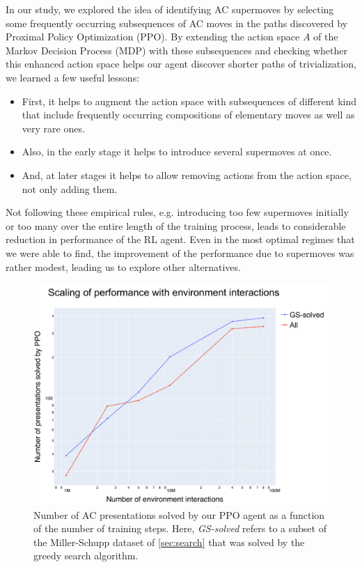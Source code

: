 In our study, we explored the idea of identifying AC supermoves by selecting some frequently occurring subsequences of AC moves in the paths discovered by Proximal Policy Optimization (PPO). By extending the action space $A$ of the Markov Decision Process (MDP) with these subsequences and checking whether this enhanced action space helps our agent discover shorter paths of trivialization, we learned a few useful lessons:

\begin{itemize}

\item First, it helps to augment the action space with subsequences of different kind that include frequently occurring compositions of elementary moves as well as very rare ones.

\item  Also, in the early stage it helps to introduce several supermoves at once.

\item And, at later stages it helps to allow removing actions from the action space, not only adding them.
    
\end{itemize}

\noindent
Not following these empirical rules, e.g. introducing too few supermoves initially or too many over the entire length of the training process, leads to considerable reduction in performance of the RL agent. Even in the most optimal regimes that we were able to find, the improvement of the performance due to supermoves was rather modest, leading us to explore other alternatives.

\begin{figure}
	\centering
	\includegraphics[scale=0.35]{fig/scaling_env.pdf}
	\caption{Number of AC presentations solved by our PPO agent as a function of the number of training steps. Here, \textit{GS-solved} refers to a subset of the Miller-Schupp dataset of \autoref{sec:search} that was solved by the greedy search algorithm.}
	\label{fig:scaling_env}
\end{figure}

